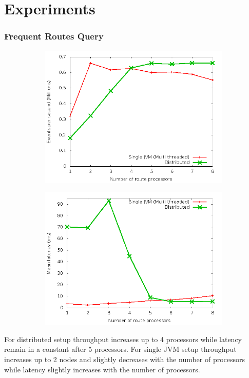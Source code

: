 \documentclass[handout]{beamer}
\begin{document}
\section{Experiments}

\begin{frame}
\frametitle{Frequent Routes Query}

\begin{figure}
        \centering
        \begin{subfigure}[b]{0.45\textwidth}
                \includegraphics[width=\textwidth]{throughput_route.png}
        \end{subfigure}
        \begin{subfigure}[b]{0.45\textwidth}
                \includegraphics[width=\textwidth]{latency_route.png}
        \end{subfigure}
\end{figure}

\footnotesize For distributed setup throughput increases up to 4 processors while latency remain in a constant after 5 processors. For single JVM setup throughput increases up to 2 nodes and slightly decreases with the number of processors while latency slightly increases with the number of processors.
 

\end{frame}
\end{document}
